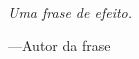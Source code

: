 \begin{flushright}
~\vfill

\emph{Uma frase de efeito.}

---Autor da frase

\vfill
\end{flushright}

